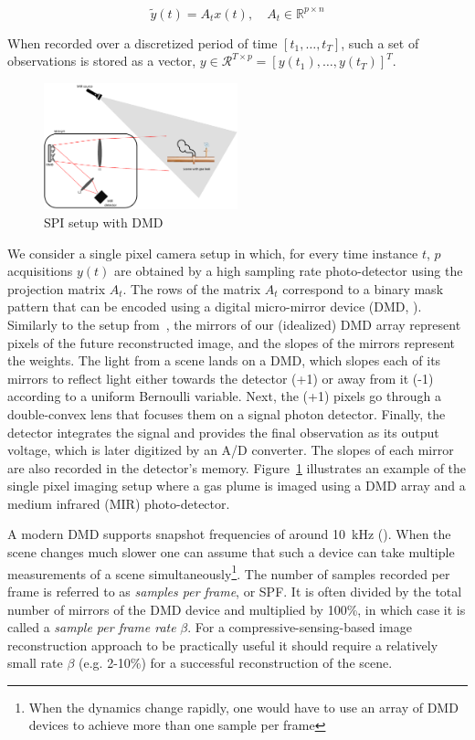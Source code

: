\begin{equation}
    \label{eq:cs_definition}
    \tilde{y}(t) = A_t x(t), \quad A_t \in \mathbb{R}^{p\times n}
\end{equation}

When recorded over a discretized period of time $[t_1, \dots, t_T]$, such a set of observations is stored as a vector, $y \in \mathcal{R}^{T \times p} = [y(t_1), \dots, y(t_T)]^T$.

\begin{figure}
\centering
\includegraphics[width = 0.5\textwidth]{figures/SPI_setup.pdf}
\caption{SPI setup with DMD \label{fig:SPI}}
\end{figure}

We consider a single pixel camera setup in which, for every time instance $t$, $p$ acquisitions $y(t)$ are obtained by a high sampling rate photo-detector using the projection matrix $A_t$. The rows of the matrix $A_t$ correspond to a binary mask pattern that can be encoded using a digital micro-mirror device (DMD, \cite{pittman1995optical, sampsell1993overview}). Similarly to the setup from~\cite{duarte2008single}, the mirrors of our (idealized) DMD array represent pixels of the future reconstructed image, and the slopes of the mirrors represent the weights. The light from a scene lands on a DMD, which slopes each of its mirrors to reflect light either towards the detector (+1) or away from it (-1) according to a uniform Bernoulli variable. Next, the (+1) pixels go through a double-convex lens that focuses them on a signal photon detector. Finally, the detector integrates the signal and provides the final observation as its output voltage, which is later digitized by an A/D converter. The slopes of each mirror are also recorded in the detector's memory. Figure~\ref{fig:SPI} illustrates an example of the single pixel imaging setup where a gas plume is imaged using a DMD array and a medium infrared (MIR) photo-detector. 

A modern DMD supports snapshot frequencies of around 10~kHz (\cite{wang2022single}). When the scene changes much slower one can assume that such a device can take multiple measurements of a scene simultaneously\footnote{When the dynamics change rapidly, one would have to use an array of DMD devices to achieve more than one sample per frame}. The number of samples recorded per  frame is referred to as \textit{samples per frame}, or SPF. It is often divided by the total number of mirrors of the DMD device and multiplied by 100\%, in which case it is called a \textit{sample per frame rate} $\beta$. For a compressive-sensing-based image reconstruction approach to be practically useful it should require a relatively small rate $\beta$ (e.g. 2-10\%) for a successful reconstruction  of the scene.

